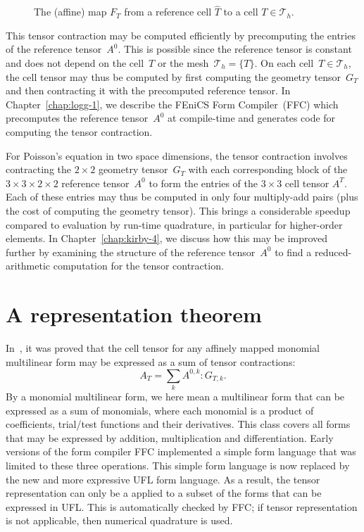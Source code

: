 \begin{figure}
\bwfig
\centering
  \caption{The (affine) map $F_T$ from a reference cell $\hat{T}$
    to a cell $T \in \mathcal{T}_h$.}
  \label{fig:affinemap}
\end{figure}

This tensor contraction may be computed efficiently by precomputing
the entries of the reference tensor~$A^0$. This is possible since the
reference tensor is constant and does not depend on the cell~$T$ or
the mesh~$\mathcal{T}_h = \{T\}$. On each cell~$T \in \mathcal{T}_h$,
the cell tensor may thus be computed by first computing the geometry
tensor~$G_T$ and then contracting it with the precomputed reference
tensor. In Chapter~\ref{chap:logg-1}, we describe the FEniCS Form
Compiler~(FFC) which precomputes the reference tensor~$A^0$ at
compile-time and generates code for computing the tensor contraction.

For Poisson's equation in two space dimensions, the tensor contraction
involves contracting the $2 \times 2$ geometry tensor~$G_T$ with each
corresponding block of the $3 \times 3 \times 2 \times 2$ reference
tensor~$A^0$ to form the entries of the $3 \times 3$ cell tensor
$A^T$. Each of these entries may thus be computed in only four
multiply-add pairs (plus the cost of computing the geometry
tensor). This brings a considerable speedup compared to evaluation by
run-time quadrature, in particular for higher-order elements. In
Chapter~\ref{chap:kirby-4}, we discuss how this may be improved
further by examining the structure of the reference tensor~$A^0$ to
find a reduced-arithmetic computation for the tensor contraction.

\section{A representation theorem}

In~\citet{KirbyLogg2006}, it was proved that the cell tensor for any
affinely mapped monomial multilinear form may be expressed as a sum
of tensor contractions:
\begin{equation} \label{eq:tensorcontraction}
  A_T = \sum_k A^{0,k} : G_{T,k}.
\end{equation}
By a monomial multilinear form, we here mean a multilinear form that
can be expressed as a sum of monomials, where each monomial is a
product of coefficients, trial/test functions and their derivatives.
This class covers all forms that may be expressed by addition,
multiplication and differentiation. Early versions of the form
compiler FFC implemented a simple form language that was limited to
these three operations. This simple form language is now replaced by
the new and more expressive UFL form language. As a result, the tensor
representation can only be a applied to a subset of the forms that
can be expressed in UFL. This is automatically checked by FFC; if tensor
representation is not applicable, then numerical quadrature is used.

